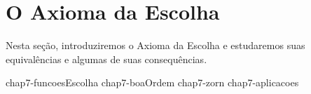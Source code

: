 \chapter{O Axioma da Escolha}\label{chap:axiomaDaEscolha}
Nesta seção, introduziremos o Axioma da Escolha e estudaremos suas equivalências e algumas de suas consequências.

{chap7-funcoesEscolha}
{chap7-boaOrdem}
{chap7-zorn}
{chap7-aplicacoes}